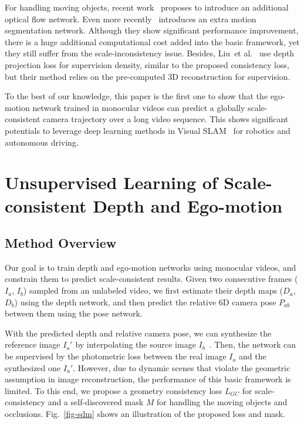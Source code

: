 \documentclass{article}
\newcommand{\figref}[1]{Fig.~\ref{#1}}
\def\etal{et al.}
\begin{document}
For handling moving objects, recent work~\cite{yin2018geonet, zou2018df} proposes to introduce an additional optical flow network.
Even more recently~\cite{ranjan2019cc} introduces an extra motion segmentation network.
Although they show significant performance improvement, there is a huge additional computational cost added into the basic framework, yet they still suffer from the scale-inconsistency issue.
Besides, Liu~\etal~\cite{liu2018self} use depth projection loss for supervision density, similar to the proposed consistency loss,
but their method relies on the pre-computed 3D reconstruction for supervision.

To the best of our knowledge, this paper is the first one to show that the ego-motion network trained in monocular videos can predict a globally scale-consistent camera trajectory over a long video sequence.
This shows significant potentials to leverage deep learning methods in Visual SLAM~\cite{mur2015orb} for robotics and autonomous driving.



\section{Unsupervised Learning of Scale-consistent Depth and Ego-motion}

\subsection{Method Overview}\label{sec-overview}
Our goal is to train depth and ego-motion networks using monocular videos,
and constrain them to predict scale-consistent results.
Given two consecutive frames ($I_a$, $I_b$) sampled from an unlabeled video, 
we first estimate their depth maps ($D_a$, $D_b$) using the depth network,
and then predict the relative 6D camera pose $P_{ab}$ between them using the pose network.

With the predicted depth and relative camera pose, we can synthesize the reference image $I_a'$ by interpolating the source image $I_b$~\cite{jaderberg2015stn, zhou2017unsupervised}.
Then, the network can be supervised by the photometric loss between the real image $I_a$ and the synthesized one $I_a'$.
However, due to dynamic scenes that violate the geometric assumption in image reconstruction, the performance of this basic framework is limited.
To this end, we propose a geometry consistency loss $L_{GC}$ for scale-consistency and a self-discovered mask $M$ for handling the moving objects and occlusions.
\figref{fig-sdm} shows an illustration of the proposed loss and mask.
\end{document}
